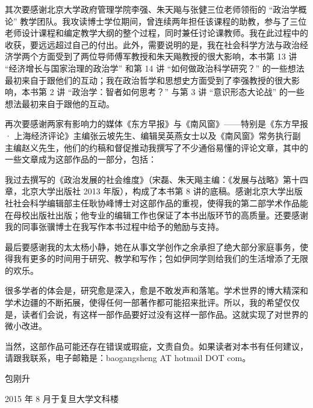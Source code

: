 其次要感谢北京大学政府管理学院李强、朱天飚与张健三位老师领衔的 “政治学概论” 教学团队。我攻读博士学位期间，曾连续两年担任该课程的助教，参与了三位老师设计课程和编定教学大纲的整个过程，同时兼任讨论课教师。我在此过程中的收获，要远远超过自己的付出。此外，需要说明的是，我在社会科学方法与政治经济学两个方面受到了两位导师傅军教授和朱天飚教授的很大影响，本书第 13 讲 “经济增长与国家治理的政治学” 和第 14 讲 “如何做政治科学研究？” 的一些想法最初来自于跟他们的互动；我在政治哲学和思想史方面受到了李强教授的很大影响，本书第 2 讲 “政治学：智者如何思考？” 与第 3 讲 “意识形态大论战” 的一些想法最初来自于跟他的互动。

再次要感谢两家有影响力的媒体《东方早报》与《南风窗》——特别是《东方早报 · 上海经济评论》主编张云坡先生、编辑吴英燕女士以及《南风窗》常务执行副主编赵义先生，他们的约稿和督促推动我撰写了不少通俗易懂的评论文章，其中的一些文章成为这部作品的一部分，包括：


我过去撰写的《政治发展的社会维度》（宋磊、朱天飚主编：《发展与战略》第十四章，北京大学出版社 2013 年版），构成了本书第 8 讲的底稿。感谢北京大学出版社社会科学编辑部主任耿协峰博士对这部作品的重视，使得我的第二部学术作品能在母校出版社出版；他专业的编辑工作也保证了本书出版环节的高质量。还要感谢我的同事张骥博士在我写作本书过程中给予的勉励与支持。

最后要感谢我的太太杨小静，她在从事文学创作之余承担了绝大部分家庭事务，使得我有更多的时间用于研究、教学和写作；包如伊同学则给我们的生活增添了无限的欢乐。

很多学者的体会是，研究愈是深入，愈是不敢发声和落笔。学术世界的博大精深和学术边疆的不断拓展，使得任何一部著作都可能招来批评。所以，我的希望仅仅是，读者们会说，有这样一部作品要好过没有这样一部作品。这就实现了对世界的微小改进。

当然，这部作品可能还存在错误或瑕疵，文责自负。如果读者对本书有任何建议，请跟我联系，电子邮箱是：baogangsheng AT hotmail DOT com。

\closing{包刚升}{2015 年 8 月于复旦大学文科楼}
